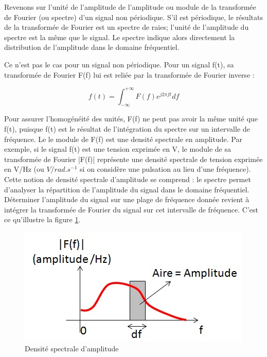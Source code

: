 	Revenons sur l'unité de l'amplitude de l'amplitude ou module de la transformée de Fourier (ou spectre) d'un signal non périodique. S'il est périodique, le résultats de la transformée de Fourier est un spectre de raies; l'unité de l'amplitude du spectre est la même que le signal. Le spectre indique alors directement la distribution de l'amplitude dans le domaine fréquentiel.
	
	Ce n'est pas le cas pour un signal non périodique. Pour un signal f(t), sa transformée de Fourier F(f) lui est reliée par la transformée de Fourier inverse :
	
	\begin{equation}\label{key}
	f(t)=\int_{-\infty}^{+\infty}F(f)e^{j2\pi ft}df
	\end{equation}
	
	Pour assurer l'homogénéité des unités, F(f) ne peut pas avoir la même unité que f(t), puisque f(t) est le résultat de l'intégration du spectre sur un intervalle de fréquence. Le le module de F(f) est une densité spectrale en amplitude. Par exemple, si le signal f(t) est une tension exprimée en V, le module de sa transformée de Fourier |F(f)| représente une densité spectrale de tension exprimée en V/Hz (ou $V/rad.s^{-1}$ si on considère une pulsation au lieu d'une fréquence). Cette notion de densité spectrale d'amplitude se comprend : le spectre permet d'analyser la répartition de l'amplitude du signal dans le domaine fréquentiel. Déterminer l'amplitude du signal sur une plage de fréquence donnée revient à intégrer la transformée de Fourier du signal sur cet intervalle de fréquence. C'est ce qu'illustre la figure \ref{Fig:Densite_spectrale_amplitude}.
	
	\begin{figure}[h!]
		\centering
		\includegraphics[scale=0.6]{images/Densite_spectrale_amplitude.jpg}
		\caption{Densité spectrale d'amplitude}	
		\label{Fig:Densite_spectrale_amplitude} 
	\end{figure}
	 
